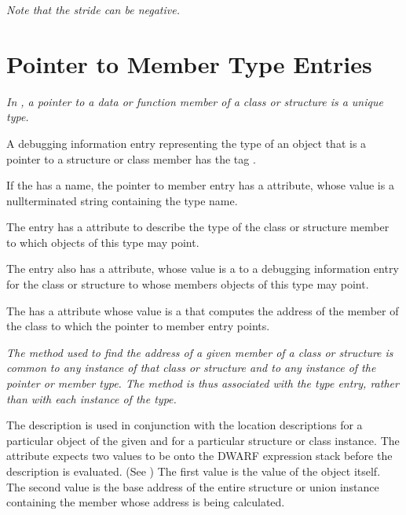 \textit{Note that the stride can be negative.}

\section{Pointer to Member Type Entries}
\label{chap:pointertomembertypeentries}

\textit{In , a
pointer to a data or function member of a class or
structure is a unique type.}

A debugging information entry representing the type of an
object that is a pointer to a structure or class member has
the tag \DWTAGptrtomembertypeTARG.

If the  has a name, the
pointer to member entry has a
\DWATname{} attribute,
whose value is a
null\dash terminated string containing the type name.

The  entry
has
a \DWATtype{} attribute to
describe the type of the class or structure member to which
objects of this type may point.

The  entry
also\hypertarget{chap:DWATcontainingtypecontainingtypeofpointertomembertype}{}
has a \DWATcontainingtypeDEFN{} attribute,
whose value is a  to a debugging
information entry for the class or structure to whose members
objects of this type may point.

The\hypertarget{chap:DWATuselocationmemberlocationforpointertomembertype}{}
 has a
\DWATuselocationDEFN{} attribute
whose value is a
 that computes the
address of the member of the class to which the pointer to
member entry points.

\textit{The method used to find the address of a given member of a
class or structure is common to any instance of that class
or structure and to any instance of the pointer or member
type. The method is thus associated with the type entry,
rather than with each instance of the type.}

The \DWATuselocation{} description is used in conjunction with the
location descriptions for a particular object of the given
 and for a particular structure or
class instance. The \DWATuselocation{} attribute expects two values to
be 
onto the DWARF expression stack before the \DWATuselocation{}
description is evaluated. (See
) The first value
 is the
value of the  object itself. The second
value 
is the base address of the entire structure or union instance
containing the member whose address is being calculated.

